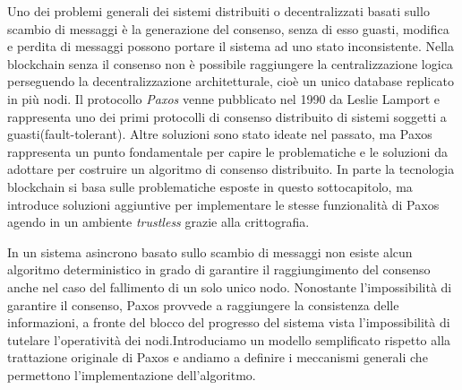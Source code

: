 	Uno dei problemi generali dei sistemi distribuiti o decentralizzati basati sullo scambio di messaggi è la generazione del consenso, senza di esso guasti, modifica e perdita di messaggi possono portare il sistema ad uno stato inconsistente. Nella blockchain senza il consenso non è possibile raggiungere la centralizzazione logica perseguendo la decentralizzazione architetturale, cioè un unico database replicato in più nodi. 
	Il protocollo \textit{Paxos} venne pubblicato nel 1990 da Leslie Lamport e rappresenta uno dei primi protocolli di consenso distribuito di sistemi soggetti a guasti(fault-tolerant)\cite{lamport2001paxos}. Altre soluzioni sono stato ideate nel passato, ma Paxos rappresenta un punto fondamentale per capire le problematiche e le soluzioni da adottare per costruire un algoritmo di consenso distribuito. In parte la tecnologia blockchain si basa sulle problematiche  esposte in questo sottocapitolo, ma introduce soluzioni aggiuntive per implementare le stesse funzionalità di Paxos agendo in un ambiente \textit{trustless} grazie alla crittografia.
	
	In un sistema asincrono basato sullo scambio di messaggi non esiste alcun algoritmo deterministico in grado di garantire il raggiungimento del consenso anche nel caso del fallimento di un solo unico nodo\cite{fischer1985impossibility}.
	Nonostante l'impossibilità di garantire il consenso, Paxos provvede a raggiungere la consistenza delle informazioni, a fronte del blocco del progresso del sistema vista l'impossibilità di tutelare l'operatività dei nodi.Introduciamo un modello semplificato rispetto alla trattazione originale di Paxos e andiamo a definire i meccanismi generali che permettono l'implementazione dell'algoritmo.
	 
	\iffalse
	I matematici dell’isola di Paxos elaborarono un complesso sistema per garantire consistenza e progresso al parlamento.
	Tuttavia questo meccanismo aveva un punto di debolezza relativamente all’elezione dei nuovi membri del parlamento, che avveniva utilizzando le regolari procedure del parlamento.
	Un giorno, a causa di un errore, fu passata una legge che asseriva che gli unici membri del parlamento erano dei marinai periti in un incidente navale.
	Da quel momento il parlamento fu abbandonato e la civiltà di Paxos tramontò rapidamente, finchè un generale di nome Λαμπσων prese possesso dell’isola con un colpo di stato instaurando una dittatura militare che pose fine a secoli di progresso governativo.
	\fi

